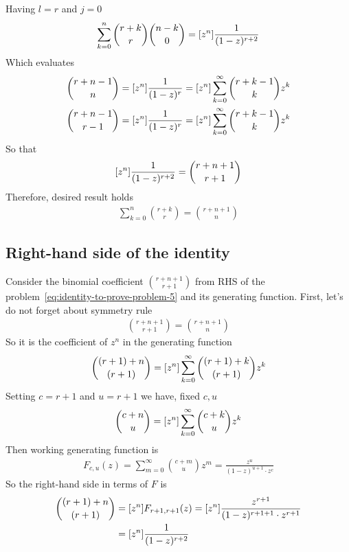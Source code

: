 Having $l=r$ and $j=0$
\begin{align*}
    \sum_{k=0}^{n} \binom{r+k}{r} \binom{n-k}{0} = [z^{n}] \frac{1}{(1-z)^{r+2}}
\end{align*}
Which evaluates
\begin{align*}
    \binom{r+n-1}{n}   &= [z^{n}] \frac{1}{(1-z)^r} = [z^{n}] \sum_{k=0}^\infty \binom{r+k-1}{k} z^k \\
    \binom{r+n-1}{r-1} &= [z^{n}] \frac{1}{(1-z)^r} = [z^{n}] \sum_{k=0}^\infty \binom{r+k-1}{k} z^k
\end{align*}
So that
\begin{align*}
    [z^{n}] \frac{1}{(1-z)^{r+2}} = \binom{r+n+1}{r+1}
\end{align*}
Therefore, desired result holds
\begin{align*}
    \sum_{k=0}^{n} \binom{r+k}{r} = \binom{r+n+1}{n}
\end{align*}
\subsection{Right-hand side of the identity}
\label{subsec:right-hand-side-of-the-identity}
Consider the binomial coefficient $\binom{r+n+1}{r+1}$ from RHS of the problem~\eqref{eq:identity-to-prove-problem-5}
and its generating function.
First, let's do not forget about symmetry rule
\begin{align*}
    \binom{r+n+1}{r+1} = \binom{r+n+1}{n}
\end{align*}
So it is the coefficient of $z^n$ in the generating function
\begin{align*}
    \binom{(r+1)+n}{(r+1)} = [z^{n}] \sum_{k=0}^{\infty} \binom{(r+1)+k}{(r+1)} z^k
\end{align*}
Setting $c=r+1$ and $u=r+1$ we have, fixed $c,u$
\begin{align*}
    \binom{c+n}{u} = [z^{n}] \sum_{k=0}^{\infty} \binom{c+k}{u} z^k
\end{align*}
Then working generating function is
\begin{align*}
    F_{c,u}(z) = \sum_{m=0}^{\infty} \binom{c+m}{u} z^{m} = \frac{z^u}{(1-z)^{u+1} \cdot z^c}
\end{align*}
So the right-hand side in terms of $F$ is
\begin{align*}
    \binom{(r+1)+n}{(r+1)}
    &= [z^{n}] F_{r+1, r+1}(z)
    = [z^{n}] \frac{z^{r+1}}{(1-z)^{r+1+1} \cdot z^{r+1}} \\
    &= [z^{n}] \frac{1}{(1-z)^{r+2}} \\
\end{align*}





\clearpage
